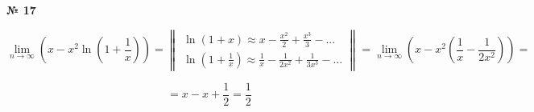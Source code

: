 \documentclass{article}
\begin{document}
\textbf{№ 17} 

$$ \lim_{n\to\infty} \left(x-x^2\ln(1+\frac{1}{x})\right) 
= \begin{Vmatrix}\ln(1+x) \approx x-\frac{x^2}{2} + \frac{x^3}{3} - ... \\\ln(1+\frac{1}{x}) \approx \frac{1}{x} - \frac{1}{2x^2} + \frac{1}{3x^3} - ... \end{Vmatrix} 
= \lim_{n\to\infty} \left(x-x^2(\frac{1}{x}-\frac{1}{2x^2})\right) = $$

$$ = x-x+\frac{1}{2} = \frac{1}{2} $$
\end{document}
